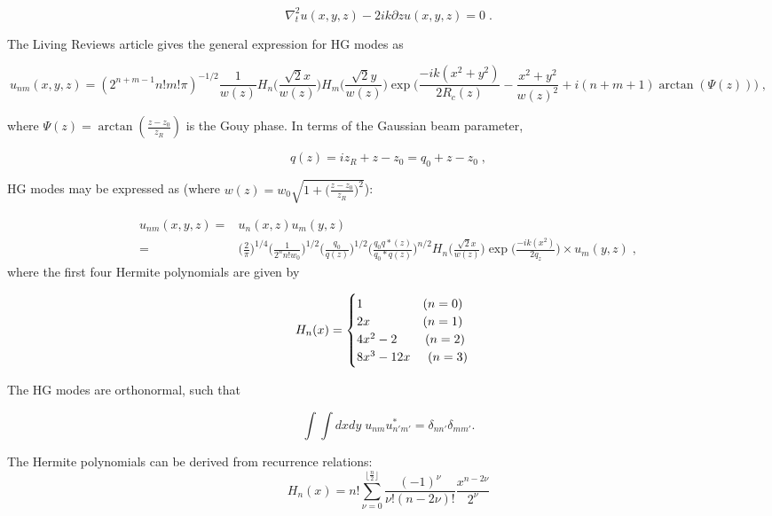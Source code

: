 \documentclass[aps,twoside,secnumarabic,balancelastpage,amsmath,amssymb,nofootinbib,hyperref=pdftex]{revtex4}
\newcommand\tab[1][3mm]{\hspace*{#1}}
\newcommand{\Hn}{H_{n}\Big(\frac{\sqrt{2}x}{w(z)}\Big)}
\newcommand{\bigfrac}[2]{\Big( \frac{#1}{#2}\Big)}
\begin{document}
\begin{equation}
	\nabla_{t}^2u(x,y,z)-2ik\partial{z}u(x,y,z)=0 \; .
\end{equation}

The Living Reviews article \citep{Bond} gives the general expression for HG modes as
	
	\begin{equation} \label{eq:1}
		u_{nm}(x,y,z)=(2^{n+m-1}n!m!\pi)^{-1/2}
		\frac{1}{w(z)}H_{n} \Big( \frac{\sqrt{2}x}{w(z)} \Big)
		H_{m} \Big(\frac{\sqrt{2}y}{w(z)} \Big)
		\exp 
		\Big(
		\frac{-ik(x^{2}+y^{2})}{2R_{c}(z)}
		-\frac{x^{2}+y^{2}}{w(z)^{2}} 
		+i(n+m+1)\arctan(\Psi(z))	
		\Big)\;,
	\end{equation}
	
where $\Psi(z) = \arctan(\frac{z-z_0}{z_R})$ is the Gouy phase. In terms of the Gaussian beam parameter,
	
	\begin{equation} \label{eq:2}
		q(z)=iz_{R}+z-z_{0}=q_{0}+z-z_{0}\;,
	\end{equation}
	
	HG modes may be expressed as (where $w(z)=w_0 \sqrt{1+\bigfrac{z-z_0}{z_R}^2}$):
	
	\begin{align} \label{eq:3}
		u_{nm}(x,y,z)=& u_{n}(x,z)u_{m}(y,z)
		\nonumber\\=& 
		\Big(\frac{2}{\pi}\Big)^{1/4}
		\Big(\frac{1}{2^{n}n!w_{0}}\Big)^{1/2}
		\Big(\frac{q_{0}}{q(z)}\Big)^{1/2}
		\Big(\frac{q_{0}q*(z)}{q_{0}*q(z)}\Big)^{n/2}
		\Hn
		\exp\Big(\frac{-ik(x^{2})}{2q_{z}}\Big)
		\times u_{m}(y,z)
		\;,
	\end{align}
where the first four Hermite polynomials  are given by	

\[
  H_{n}(x)=\begin{cases}
               1 \tab\tab\tab\tab\tab\;\;(n=0)\\
               2x \tab\tab\tab\tab\;\;\;(n=1)\\
               4x^{2}-2 \tab\tab\;\;(n=2)\\
               8x^{3}-12x \tab\;\;(n=3)
            \end{cases}
\]

The HG modes are orthonormal, such that

\begin{equation}
	\int \int dx dy \; u_{nm} u_{n'm'}^* = \delta_{nn'} \delta_{mm'}.
\end{equation}

The Hermite polynomials can be derived from recurrence relations:
\begin{equation*}
	H_n(x) =
		n! \sum_{\nu=0}^{\lfloor{\frac{n}{2}}\rfloor}
		\frac{(-1)^\nu}{\nu!(n-2\nu)!} 
		\frac{x^{n-2\nu}}{2^\nu}
\end{equation*}
\end{document}
